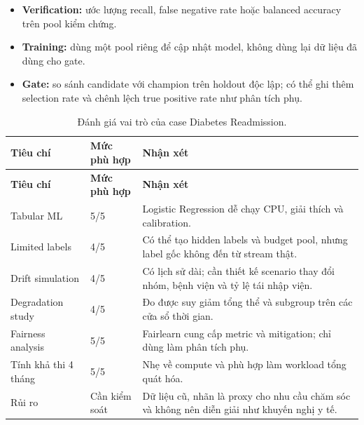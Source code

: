 \begin{itemize}
  \item \textbf{Verification:} ước lượng recall, false negative rate hoặc balanced accuracy trên pool kiểm chứng.
  \item \textbf{Training:} dùng một pool riêng để cập nhật model, không dùng lại dữ liệu đã dùng cho gate.
  \item \textbf{Gate:} so sánh candidate với champion trên holdout độc lập; có thể ghi thêm selection rate và chênh lệch true positive rate như phân tích phụ.
\end{itemize}

\begin{longtable}{@{}L{3.4cm} L{2.2cm} L{\dimexpr\linewidth-5.6cm-4\tabcolsep\relax}@{}}
\caption{Đánh giá vai trò của case Diabetes Readmission.}\label{tab:diabetes-evaluation}\\
\toprule\textbf{Tiêu chí} & \textbf{Mức phù hợp} & \textbf{Nhận xét}\\
\midrule\endfirsthead
\toprule\textbf{Tiêu chí} & \textbf{Mức phù hợp} & \textbf{Nhận xét}\\
\midrule\endhead
Tabular ML & 5/5 & Logistic Regression dễ chạy CPU, giải thích và calibration.\\
Limited labels & 4/5 & Có thể tạo hidden labels và budget pool, nhưng label gốc không đến từ stream thật.\\
Drift simulation & 4/5 & Có lịch sử dài; cần thiết kế scenario thay đổi nhóm, bệnh viện và tỷ lệ tái nhập viện.\\
Degradation study & 4/5 & Đo được suy giảm tổng thể và subgroup trên các cửa sổ thời gian.\\
Fairness analysis & 5/5 & Fairlearn cung cấp metric và mitigation; chỉ dùng làm phân tích phụ.\\
Tính khả thi 4 tháng & 5/5 & Nhẹ về compute và phù hợp làm workload tổng quát hóa.\\
Rủi ro & Cần kiểm soát & Dữ liệu cũ, nhãn là proxy cho nhu cầu chăm sóc và không nên diễn giải như khuyến nghị y tế.\\
\bottomrule
\end{longtable}
